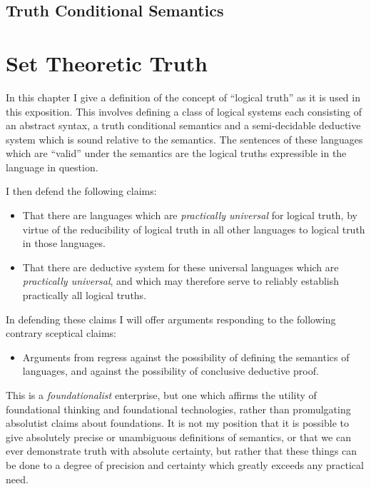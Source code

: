 \documentclass[10pt,titlepage]{book}
\begin{document}
\subsection{Truth Conditional Semantics}

\section{Set Theoretic Truth}

In this chapter I give a definition of the concept of ``logical truth'' as it is used in this exposition.
This involves defining a class of logical systems each consisting of an abstract syntax, a truth conditional semantics and a semi-decidable deductive system which is sound relative to the semantics.
The sentences of these languages which are ``valid'' under the semantics are the logical truths expressible in the language in question.

I then defend the following claims:

\begin{itemize}

\item That there are languages which are \emph{practically universal} for logical truth, by virtue of the reducibility of logical truth in all other languages to logical truth in those languages.
\item That there are deductive system for these universal languages which are \emph{practically universal}, and which may therefore serve to reliably establish practically all logical truths.
\end{itemize}

In defending these claims I will offer arguments responding to the following contrary sceptical claims:

\begin{itemize}
\item Arguments from regress against the possibility of defining the semantics of languages, and against the possibility of conclusive deductive proof.
\end{itemize}

This is a \emph{foundationalist} enterprise, but one which affirms the utility of foundational thinking and foundational technologies, rather than promulgating absolutist claims about foundations.
It is not my position that it is possible to give absolutely precise or unambiguous definitions of semantics, or that we can ever demonstrate truth with absolute certainty, but rather that these things can be done to a degree of precision and certainty which greatly exceeds any practical need.
\end{document}
